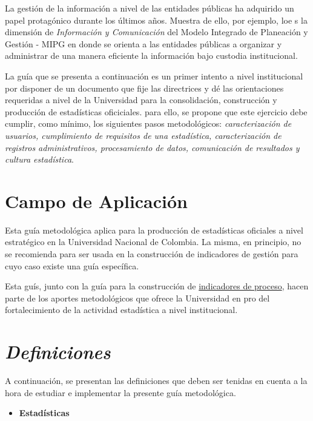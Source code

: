 \documentclass[
]{book}
\providecommand{\tightlist}{%
  \setlength{\itemsep}{0pt}\setlength{\parskip}{0pt}}
\begin{document}
La gestión de la información a nivel de las entidades públicas ha adquirido un papel protagónico durante los últimos años. Muestra de ello, por ejemplo, loe s la dimensión de \emph{Información y Comunicación} del Modelo Integrado de Planeación y Gestión - MIPG en donde se orienta a las entidades públicas a organizar y administrar de una manera eficiente la información bajo custodia institucional.

La guía que se presenta a continuación es un primer intento a nivel institucional por disponer de un documento que fije las directrices y dé las orientaciones requeridas a nivel de la Universidad para la consolidación, construcción y producción de estadísticas oficiciales. para ello, se propone que este ejercicio debe cumplir, como mínimo, los siguientes pasos metodológicos: \emph{caracterización de usuarios, cumplimiento de requisitos de una estadística, caracterización de registros administrativos, procesamiento de datos, comunicación de resultados y cultura estadística}.

\hypertarget{campo-de-aplicaciuxf3n}{%
\chapter{\texorpdfstring{\textbf{Campo de Aplicación}}{Campo de Aplicación}}\label{campo-de-aplicaciuxf3n}}

Esta guía metodológica aplica para la producción de estadísticas oficiales a nivel estratégico en la Universidad Nacional de Colombia. La misma, en principio, no se recomienda para ser usada en la construcción de indicadores de gestión para cuyo caso existe una guía específica.

Esta guís, junto con la guía para la construcción de \href{https://estadisticaun.github.io/G_Procesos/}{indicadores de proceso}, hacen parte de los aportes metodológicos que ofrece la Universidad en pro del fortalecimiento de la actividad estadística a nivel institucional.

\hypertarget{definiciones}{%
\chapter{\texorpdfstring{\textbf{\emph{Definiciones}}}{Definiciones}}\label{definiciones}}

A continuación, se presentan las definiciones que deben ser tenidas en cuenta a la hora de estudiar e implementar la presente guía metodológica.

\begin{itemize}
\tightlist
\item
  \textbf{Estadísticas}
\end{itemize}
\end{document}
